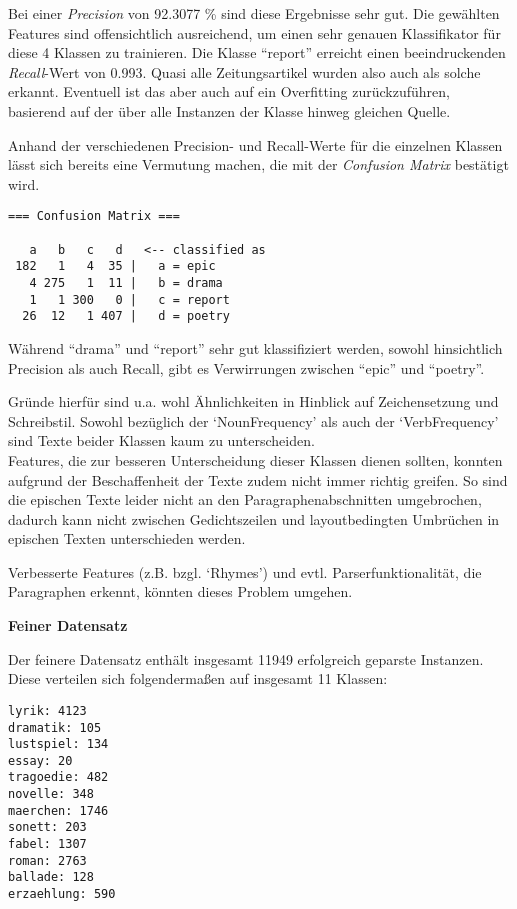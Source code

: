 \documentclass[]{article}
\begin{document}
Bei einer \emph{Precision} von 92.3077 \% sind diese Ergebnisse sehr
gut. Die gewählten Features sind offensichtlich ausreichend, um einen
sehr genauen Klassifikator für diese 4 Klassen zu trainieren. Die Klasse
``report'' erreicht einen beeindruckenden \emph{Recall}-Wert von 0.993.
Quasi alle Zeitungsartikel wurden also auch als solche erkannt.
Eventuell ist das aber auch auf ein Overfitting zurückzuführen,
basierend auf der über alle Instanzen der Klasse hinweg gleichen Quelle.

Anhand der verschiedenen Precision- und Recall-Werte für die einzelnen
Klassen lässt sich bereits eine Vermutung machen, die mit der
\emph{Confusion Matrix} bestätigt wird.

\vspace{4 mm}\begin{verbatim}
=== Confusion Matrix ===

   a   b   c   d   <-- classified as
 182   1   4  35 |   a = epic
   4 275   1  11 |   b = drama
   1   1 300   0 |   c = report
  26  12   1 407 |   d = poetry
\end{verbatim}\vspace{4 mm}

Während ``drama'' und ``report'' sehr gut klassifiziert werden, sowohl
hinsichtlich Precision als auch Recall, gibt es Verwirrungen zwischen
``epic'' und ``poetry''.

Gründe hierfür sind u.a. wohl Ähnlichkeiten in Hinblick auf
Zeichensetzung und Schreibstil. Sowohl bezüglich der `NounFrequency' als
auch der `VerbFrequency' sind Texte beider Klassen kaum zu
unterscheiden.\\
Features, die zur besseren Unterscheidung dieser Klassen dienen sollten,
konnten aufgrund der Beschaffenheit der Texte zudem nicht immer richtig
greifen. So sind die epischen Texte leider nicht an den
Paragraphenabschnitten umgebrochen, dadurch kann nicht zwischen
Gedichtszeilen und layoutbedingten Umbrüchen in epischen Texten
unterschieden werden.

Verbesserte Features (z.B. bzgl. `Rhymes') und evtl.
Parserfunktionalität, die Paragraphen erkennt, könnten dieses Problem
umgehen.

\textbf{Feiner Datensatz}

Der feinere Datensatz enthält insgesamt 11949 erfolgreich geparste
Instanzen. Diese verteilen sich folgendermaßen auf insgesamt 11 Klassen:

\vspace{4 mm}\begin{verbatim}
lyrik: 4123
dramatik: 105
lustspiel: 134
essay: 20
tragoedie: 482
novelle: 348
maerchen: 1746
sonett: 203
fabel: 1307
roman: 2763
ballade: 128
erzaehlung: 590
\end{verbatim}\vspace{4 mm}
\end{document}
